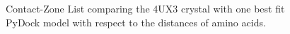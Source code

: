 \documentclass[twocolumn]{bmcart}%
\def\CoZoList{Contact-Zone List\xspace}
\begin{document}
\begin{figure}[ht!]
    \centering
    \vspace{10pt}
    \vspace{5pt}
    \caption{\CoZoList comparing the 4UX3 crystal with one best fit PyDock model with respect to the distances of amino acids.}
  \label{fig:coiled2}
\end{figure}
\end{document}
